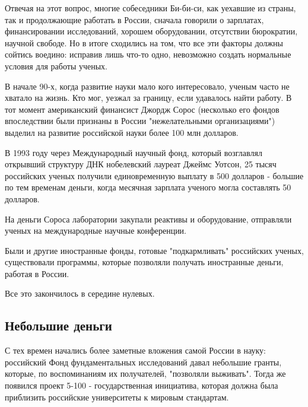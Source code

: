 Отвечая на этот вопрос, многие собеседники Би-би-си, как уехавшие из страны, так и продолжающие работать в России, сначала говорили о зарплатах, финансировании исследований, хорошем оборудовании, отсутствии бюрократии, научной свободе. Но в итоге сходились на том, что все эти факторы должны сойтись воедино: исправив лишь что-то одно, невозможно создать нормальные условия для работы ученых.

В начале 90-х, когда развитие науки мало кого интересовало, ученым часто не хватало на жизнь. Кто мог, уезжал за границу, если удавалось найти работу. В тот момент американский финансист Джордж Сорос (несколько его фондов впоследствии были признаны в России "нежелательными организациями") выделил на развитие российской науки более 100 млн долларов.

В 1993 году через Международный научный фонд, который возглавлял открывший структуру ДНК нобелевский лауреат Джеймс Уотсон, 25 тысяч российских ученых получили единовременную выплату в 500 долларов - большие по тем временам деньги, когда месячная зарплата ученого могла составлять 50 долларов.

На деньги Сороса лаборатории закупали реактивы и оборудование, отправляли ученых на международные научные конференции.

Были и другие иностранные фонды, готовые "подкармливать" российских ученых, существовали программы, которые позволяли получать иностранные деньги, работая в России.

Все это закончилось в середине нулевых.

\subsection{Небольшие деньги}
С тех времен начались более заметные вложения самой России в науку: российский Фонд фундаментальных исследований давал небольшие гранты, которые, по воспоминаниям их получателей, "позволяли выживать". Тогда же появился проект 5-100 - государственная инициатива, которая должна была приблизить российские университеты к мировым стандартам.

